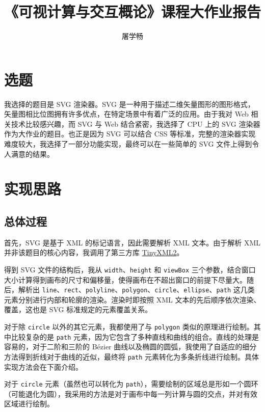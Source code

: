 \documentclass[UTF8]{ctexart}
\title{《可视计算与交互概论》课程大作业报告}
\author{屠学畅}
\begin{document}
\maketitle

\thispagestyle{empty}

\section{选题}

我选择的题目是 SVG 渲染器。SVG 是一种用于描述二维矢量图形的图形格式，矢量图相比位图拥有许多优点，在特定场景中有着广泛的应用。由于我对 Web 相关技术比较感兴趣，而 SVG 与 Web 结合紧密，我选择了 CPU 上的 SVG 渲染器作为大作业的题目。也正是因为 SVG 可以结合 CSS 等标准，完整的渲染器实现难度较大，我选择了一部分功能实现，最终可以在一些简单的 SVG 文件上得到令人满意的结果。

\section{实现思路}

\subsection{总体过程}

首先，SVG 是基于 XML 的标记语言，因此需要解析 XML 文本。由于解析 XML 并非该题目的核心内容，我调用了第三方库 \href{https://github.com/leethomason/tinyxml2}{TinyXML2}。

得到 SVG 文件的结构后，我从 \texttt{width}、\texttt{height} 和 \texttt{viewBox} 三个参数，结合窗口大小计算得到画布的尺寸和偏移量，使得画布在不超出窗口的前提下尽量大。随后，解析出 \texttt{line}、\texttt{rect}、\texttt{polyline}、\texttt{polygon}、\texttt{circle}、\texttt{ellipse}、\texttt{path} 这几类元素分别进行内部和轮廓的渲染。渲染时即按照 XML 文本的先后顺序依次渲染、覆盖，这也是 SVG 标准规定的元素覆盖关系。

对于除 \texttt{circle} 以外的其它元素，我都使用了与 \texttt{polygon} 类似的原理进行绘制。其中比较复杂的是 \texttt{path} 元素，因为它包含了多种直线和曲线的组合。直线的处理是容易的，对于二阶和三阶的 Bézier 曲线以及椭圆的圆弧，我使用了自适应的细分方法得到折线对于曲线的近似，最终将 \texttt{path} 元素转化为多条折线进行绘制。具体实现方法会在下面介绍。

对于 \texttt{circle} 元素（虽然也可以转化为 \texttt{path}），需要绘制的区域总是形如一个圆环（可能退化为圆），我采用的方法是对于画布中每一列计算与圆的交点，并对有效区域进行绘制。
\end{document}
